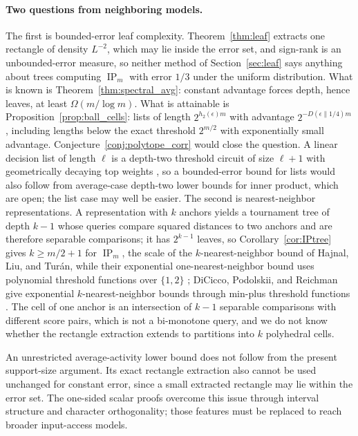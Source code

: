 \documentclass[11pt]{article}
\theoremstyle{definition}
\newcommand{\ip}{\operatorname{IP}}
\begin{document}
\paragraph{Two questions from neighboring models.}
The first is bounded-error leaf complexity. Theorem~\ref{thm:leaf} extracts one rectangle of density \(L^{-2}\), which may lie inside the error set, and sign-rank is an unbounded-error measure, so neither method of Section~\ref{sec:leaf} says anything about trees computing \(\ip_m\) with error \(1/3\) under the uniform distribution. What is known is Theorem~\ref{thm:spectral_avg}: constant advantage forces depth, hence leaves, at least \(\Omega(m/\log m)\). What is attainable is Proposition~\ref{prop:ball_cells}: lists of length \(2^{h_2(\epsilon)m}\) with advantage \(2^{-D(\epsilon\|1/4)m}\), including lengths below the exact threshold \(2^{m/2}\) with exponentially small advantage. Conjecture~\ref{conj:polytope_corr} would close the question. A linear decision list of length \(\ell\) is a depth-two threshold circuit of size \(\ell+1\) with geometrically decaying top weights \cite{TV97}, so a bounded-error bound for lists would also follow from average-case depth-two lower bounds for inner product, which are open; the list case may well be easier. The second is nearest-neighbor representations. A representation with \(k\) anchors yields a tournament tree of depth \(k-1\) whose queries compare squared distances to two anchors and are therefore separable comparisons; it has \(2^{k-1}\) leaves, so Corollary~\ref{cor:IPtree} gives \(k\ge m/2+1\) for \(\ip_m\), the scale of the \(k\)-nearest-neighbor bound of Hajnal, Liu, and Tur\'an, while their exponential one-nearest-neighbor bound uses polynomial threshold functions over \(\{1,2\}\) \cite{HLT22}; DiCicco, Podolskii, and Reichman give exponential \(k\)-nearest-neighbor bounds through min-plus threshold functions \cite{DPR25}. The cell of one anchor is an intersection of \(k-1\) separable comparisons with different score pairs, which is not a bi-monotone query, and we do not know whether the rectangle extraction extends to partitions into \(k\) polyhedral cells.

An unrestricted average-activity lower bound does not follow from the present support-size argument. Its exact rectangle extraction also cannot be used unchanged for constant error, since a small extracted rectangle may lie within the error set. The one-sided scalar proofs overcome this issue through interval structure and character orthogonality; those features must be replaced to reach broader input-access models.
\end{document}
